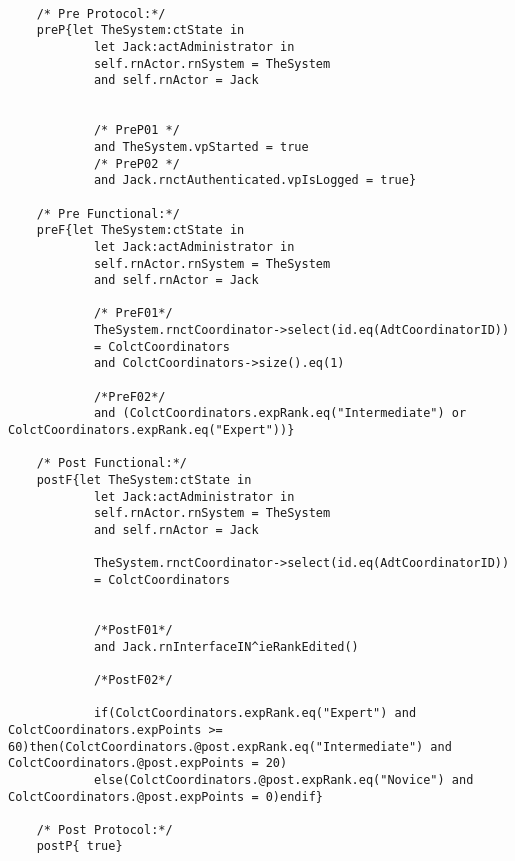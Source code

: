 	\scriptsize
	\vspace{0.5cm}
	\begin{lstlisting}[style=MessirStyle,firstnumber=auto,captionpos=b,caption={\msrmessir (MCL-oriented) specification of the operation \emph{oeRankDownCoordinator}.},label=OM-actAdministrator-oeRankDownCoordinator-MCL-LST]

	/* Pre Protocol:*/ 
	preP{let TheSystem:ctState in
			let Jack:actAdministrator in
			self.rnActor.rnSystem = TheSystem
			and self.rnActor = Jack
		
		
			/* PreP01 */
	  		and TheSystem.vpStarted = true
			/* PreP02 */
	 	 	and Jack.rnctAuthenticated.vpIsLogged = true}
	
	/* Pre Functional:*/
	preF{let TheSystem:ctState in
			let Jack:actAdministrator in
			self.rnActor.rnSystem = TheSystem
			and self.rnActor = Jack
			
			/* PreF01*/	
			TheSystem.rnctCoordinator->select(id.eq(AdtCoordinatorID))
	  		= ColctCoordinators
	  		and ColctCoordinators->size().eq(1)
	  		
	  		/*PreF02*/
	  		and (ColctCoordinators.expRank.eq("Intermediate") or ColctCoordinators.expRank.eq("Expert"))}
	
	/* Post Functional:*/ 
	postF{let TheSystem:ctState in
			let Jack:actAdministrator in
			self.rnActor.rnSystem = TheSystem
			and self.rnActor = Jack
			
			TheSystem.rnctCoordinator->select(id.eq(AdtCoordinatorID))
	  		= ColctCoordinators
			
			
			/*PostF01*/
			and Jack.rnInterfaceIN^ieRankEdited()
			
			/*PostF02*/
			
			if(ColctCoordinators.expRank.eq("Expert") and ColctCoordinators.expPoints >= 60)then(ColctCoordinators.@post.expRank.eq("Intermediate") and ColctCoordinators.@post.expPoints = 20)
			else(ColctCoordinators.@post.expRank.eq("Novice") and ColctCoordinators.@post.expPoints = 0)endif}
	
	/* Post Protocol:*/ 
	postP{ true}
	
	\end{lstlisting}
	\normalsize 
	
	
	
	





